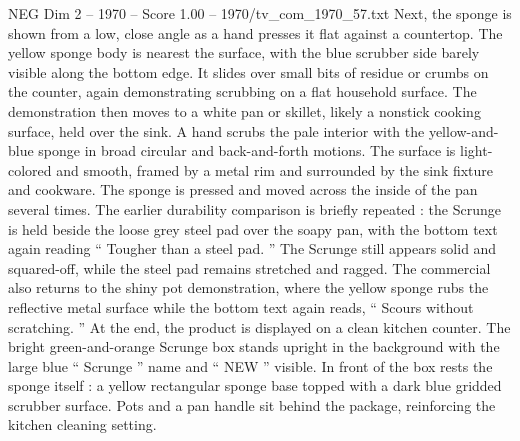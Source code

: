 \begin{textsample}{NEG Dim 2 – 1970 – Score 1.00 – 1970/tv\_com\_1970\_57.txt}
Next, the sponge is shown from a low, close angle as a hand presses it flat against a countertop.
The yellow sponge body is nearest the surface, with the blue scrubber side barely visible along the bottom edge.
It slides over small bits of residue or crumbs on the counter, again demonstrating scrubbing on a flat household surface.
The demonstration then moves to a white pan or skillet, likely a nonstick cooking surface, held over the sink.
A hand scrubs the pale interior with the yellow-and-blue sponge in broad circular and back-and-forth motions.
The surface is light-colored and smooth, framed by a metal rim and surrounded by the sink fixture and cookware.
The sponge is pressed and moved across the inside of the pan several times.
The earlier durability comparison is briefly repeated : the Scrunge is held beside the loose grey steel pad over the soapy pan, with the bottom text again reading “ Tougher than a steel pad. ” The Scrunge still appears solid and squared-off, while the steel pad remains stretched and ragged.
The commercial also returns to the shiny pot demonstration, where the yellow sponge rubs the reflective metal surface while the bottom text again reads, “ Scours without scratching. ” At the end, the product is displayed on a clean kitchen counter.
The bright green-and-orange Scrunge box stands upright in the background with the large blue “ Scrunge ” name and “ NEW ” visible.
In front of the box rests the sponge itself : a yellow rectangular sponge base topped with a dark blue gridded scrubber surface.
Pots and a pan handle sit behind the package, reinforcing the kitchen cleaning setting.

\end{textsample}
